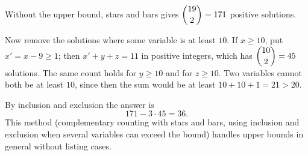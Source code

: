 Without the upper bound, stars and bars gives $\dbinom{19}{2}=171$ positive solutions.

Now remove the solutions where some variable is at least $10$. If $x\ge10$, put $x'=x-9\ge1$; then $x'+y+z=11$ in positive integers, which has $\dbinom{10}{2}=45$ solutions. The same count holds for $y\ge10$ and for $z\ge10$. Two variables cannot both be at least $10$, since then the sum would be at least $10+10+1=21>20$.

By inclusion and exclusion the answer is
\[
171-3\cdot45=\boxed{36}.
\]
This method (complementary counting with stars and bars, using inclusion and exclusion when several variables can exceed the bound) handles upper bounds in general without listing cases.
